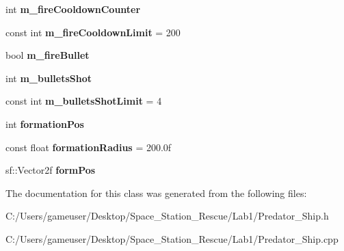\begin{DoxyCompactItemize}
\mbox{\label{class_predator___ship_a43c4801f79d50a1c82aa659cf044eb29}} 
int {\bfseries m\+\_\+fire\+Cooldown\+Counter}
\item 
\mbox{\label{class_predator___ship_a0c68e83d91ef662911bb5ed0f99e4e7c}} 
const int {\bfseries m\+\_\+fire\+Cooldown\+Limit} = 200
\item 
\mbox{\label{class_predator___ship_a7a45c977a7c37489218b558e0d17d784}} 
bool {\bfseries m\+\_\+fire\+Bullet}
\item 
\mbox{\label{class_predator___ship_ac9264a8b26d437cd7f66be147672c5d6}} 
int {\bfseries m\+\_\+bullets\+Shot}
\item 
\mbox{\label{class_predator___ship_abeb511ba94c16d740d7ab89a88523c9b}} 
const int {\bfseries m\+\_\+bullets\+Shot\+Limit} = 4
\item 
\mbox{\label{class_predator___ship_a12c8ffce8f35c32fec854ebd885d204f}} 
int {\bfseries formation\+Pos}
\item 
\mbox{\label{class_predator___ship_a0283158196fd65094bc1aa82f97d493e}} 
const float {\bfseries formation\+Radius} = 200.\+0f
\item 
\mbox{\label{class_predator___ship_a069741b7edd324f1e1dd04177a00f7ec}} 
sf\+::\+Vector2f {\bfseries form\+Pos}
\end{DoxyCompactItemize}


The documentation for this class was generated from the following files\+:\begin{DoxyCompactItemize}
\item 
C\+:/\+Users/gameuser/\+Desktop/\+Space\+\_\+\+Station\+\_\+\+Rescue/\+Lab1/Predator\+\_\+\+Ship.\+h\item 
C\+:/\+Users/gameuser/\+Desktop/\+Space\+\_\+\+Station\+\_\+\+Rescue/\+Lab1/Predator\+\_\+\+Ship.\+cpp\end{DoxyCompactItemize}

